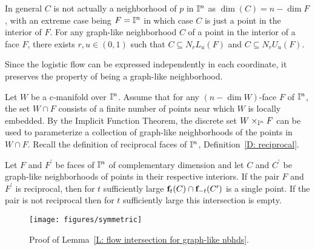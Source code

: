 In general $C$ is not actually a neighborhood of $p$ in $\mathbb{I}^n$ as $\dim(C)=n-\dim F$, with an extreme case being $F =\mathbb{I}^n$ in which case $C$ is just a point in the interior of $F$.
For any graph-like neighborhood $C$ of a point in the interior of a face $F$, there exists $r, u \in (0,1)$ such that $C \subseteq N_rL_u(F)$ and $C \subseteq N_rU_u(F)$.

Since the logistic flow can be expressed independently in each coordinate, it preserves the property of being a graph-like neighborhood.

Let $W$ be a c-manifold over $\mathbb{I}^n$.
Assume that for any $(n-\dim W)$-face $F$ of $\mathbb{I}^n$, the set $W \cap F$ consists of a finite number of points near which $W$ is locally embedded.
By the Implicit Function Theorem, the discrete set $W \times_{\mathbb{I}^n} F$ can be used to parameterize a collection of graph-like neighborhoods of the points in $W \cap F$.
Recall the definition of reciprocal faces of $\mathbb{I}^n$, Definition~\ref{D: reciprocal}.

\begin{lemma}\label{L: flow intersection for graph-like nbhds}
	Let $F$ and $F^\prime$ be faces of $\mathbb{I}^n$ of complementary dimension and let $C$ and $C^\prime$ be graph-like neighborhoods of points in their respective interiors.
	If the pair $F$ and $F^\prime$ is reciprocal, then for $t$ sufficiently large $\mathbf{f}_t(C) \cap \mathbf{f}_{-t}(C^\prime)$ is a single point.
	If the pair is not reciprocal then for $t$ sufficiently large this intersection is empty.
\end{lemma}

\begin{figure}[!h]
	\texttt{[image: figures/symmetric]}
	\caption{Proof of Lemma~\ref{L: flow intersection for graph-like nbhds}.}
	\label{F: intersection}
\end{figure}

